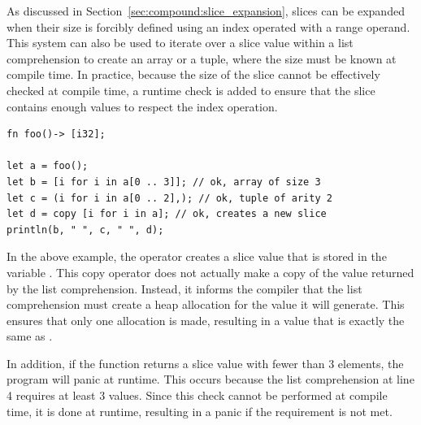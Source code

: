As discussed in Section~\ref{sec:compound:slice_expansion}, slices can be expanded when
their size is forcibly defined using an index operated with a range operand.
This system can also be used to iterate over a slice value within a list
comprehension to create an array or a tuple, where the size must be known at
compile time. In practice, because the size of the slice cannot be effectively
checked at compile time, a runtime check is added to ensure that the slice
contains enough values to respect the index operation.

\begin{lstlisting}[style=coloredverbatim, label=lst:compr:list_compr_slice_to_array, caption=List comprehension over a slice with cte size]
fn foo()-> [i32];

let a = foo();
let b = [i for i in a[0 .. 3]]; // ok, array of size 3
let c = (i for i in a[0 .. 2],); // ok, tuple of arity 2
let d = copy [i for i in a]; // ok, creates a new slice
println(b, " ", c, " ", d);
\end{lstlisting}

In the above example, the  operator creates a slice value
that is stored in the variable . This copy operator does not actually
make a copy of the value returned by the list comprehension. Instead, it informs
the compiler that the list comprehension must create a heap allocation for the
value it will generate. This ensures that only one allocation is made, resulting
in a value that is exactly the same as .

In addition, if the function  returns a slice value with fewer than 3
elements, the program will panic at runtime. This occurs because the list
comprehension at line 4 requires at least 3 values. Since this check cannot be
performed at compile time, it is done at runtime, resulting in a panic if the
requirement is not met.

\vfill%
\pagebreak
